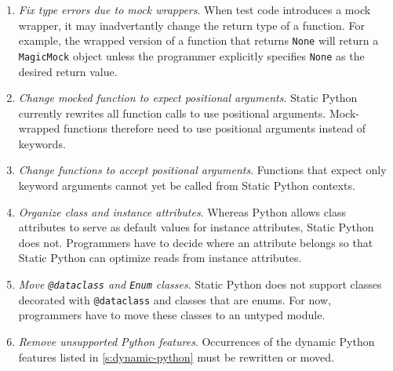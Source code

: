 \documentclass[english,cleveref,submission]{programming}
\newcommand{\SP}{Static Python}
\newcommand{\code}[1]{\texttt{#1}}
\newcommand{\ipara}[1]{\emph{#1}\/.}
\begin{document}
\begin{enumerate}
  \item
    \ipara{Fix type errors due to mock wrappers}
    When test code introduces a mock wrapper, it may inadvertantly change the
    return type of a function.
    For example, the wrapped version of a function that returns \code{None}
    will return a \code{MagicMock} object unless the programmer explicitly
    specifies \code{None} as the desired return value.

  \item
    \ipara{Change mocked function to expect positional arguments}
    \SP{} currently rewrites all function calls to use positional arguments.
    Mock-wrapped functions therefore need to use positional arguments instead of keywords.

  \item
    \ipara{Change functions to accept positional arguments}
    Functions that expect only keyword arguments cannot yet be called from \SP{} contexts.

  \item
    \ipara{Organize class and instance attributes}
    Whereas Python allows class attributes to serve as default values for instance attributes,
    \SP{} does not.
    Programmers have to decide where an attribute belongs so that \SP{} can optimize
    reads from instance attributes.

  \item
    \ipara{Move \code{@dataclass} and \code{Enum} classes}
    \SP{} does not support classes decorated with \code{@dataclass}
    and classes that are enums.
    For now, programmers have to move these classes to an untyped module.

  \item
    \ipara{Remove unsupported Python features}
    Occurrences of the dynamic Python features listed in \cref{s:dynamic-python} must be rewritten or moved.

\end{enumerate}
\end{document}
